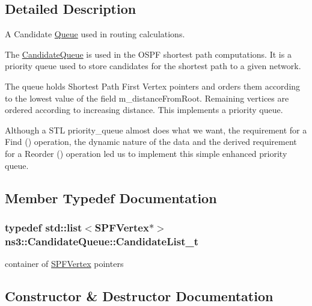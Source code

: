 \subsection{Detailed Description}
A Candidate \hyperlink{classns3_1_1Queue}{Queue} used in routing calculations. 

The \hyperlink{classns3_1_1CandidateQueue}{Candidate\+Queue} is used in the O\+S\+PF shortest path computations. It is a priority queue used to store candidates for the shortest path to a given network.

The queue holds Shortest Path First Vertex pointers and orders them according to the lowest value of the field m\+\_\+distance\+From\+Root. Remaining vertices are ordered according to increasing distance. This implements a priority queue.

Although a S\+TL priority\+\_\+queue almost does what we want, the requirement for a Find () operation, the dynamic nature of the data and the derived requirement for a Reorder () operation led us to implement this simple enhanced priority queue. 

\subsection{Member Typedef Documentation}
\subsubsection[{\texorpdfstring{Candidate\+List\+\_\+t}{CandidateList_t}}]{\setlength{\rightskip}{0pt plus 5cm}typedef {\bf std\+::list}$<${\bf S\+P\+F\+Vertex}$\ast$$>$ {\bf ns3\+::\+Candidate\+Queue\+::\+Candidate\+List\+\_\+t}\hspace{0.3cm}{\ttfamily [private]}}\hypertarget{classns3_1_1CandidateQueue_a8cd2e310f0b257a519afecbf5aeb6f2e}{}\label{classns3_1_1CandidateQueue_a8cd2e310f0b257a519afecbf5aeb6f2e}


container of \hyperlink{classns3_1_1SPFVertex}{S\+P\+F\+Vertex} pointers 



\subsection{Constructor \& Destructor Documentation}
